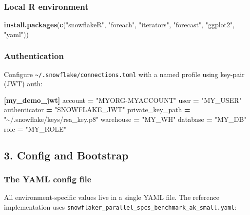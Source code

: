 \documentclass[
]{article}
\newenvironment{Shaded}{\begin{snugshade}}{\end{snugshade}}
\newcommand{\DataTypeTok}[1]{\textcolor[rgb]{0.13,0.29,0.53}{#1}}
\newcommand{\FunctionTok}[1]{\textcolor[rgb]{0.13,0.29,0.53}{\textbf{#1}}}
\newcommand{\KeywordTok}[1]{\textcolor[rgb]{0.13,0.29,0.53}{\textbf{#1}}}
\newcommand{\NormalTok}[1]{#1}
\newcommand{\OperatorTok}[1]{\textcolor[rgb]{0.81,0.36,0.00}{\textbf{#1}}}
\newcommand{\StringTok}[1]{\textcolor[rgb]{0.31,0.60,0.02}{#1}}
\begin{document}
\subsubsection{Local R environment}\label{local-r-environment}

\begin{Shaded}
\begin{Highlighting}[]
\FunctionTok{install.packages}\NormalTok{(}\FunctionTok{c}\NormalTok{(}\StringTok{"snowflakeR"}\NormalTok{, }\StringTok{"foreach"}\NormalTok{, }\StringTok{"iterators"}\NormalTok{, }\StringTok{"forecast"}\NormalTok{,}
                    \StringTok{"ggplot2"}\NormalTok{, }\StringTok{"yaml"}\NormalTok{))}
\end{Highlighting}
\end{Shaded}

\subsubsection{Authentication}\label{authentication}

Configure \texttt{\textasciitilde{}/.snowflake/connections.toml} with a
named profile using key-pair (JWT) auth:

\begin{Shaded}
\begin{Highlighting}[]
\KeywordTok{[my\_demo\_jwt]}
\DataTypeTok{account}   \OperatorTok{=} \StringTok{"MYORG{-}MYACCOUNT"}
\DataTypeTok{user}      \OperatorTok{=} \StringTok{"MY\_USER"}
\DataTypeTok{authenticator} \OperatorTok{=} \StringTok{"SNOWFLAKE\_JWT"}
\DataTypeTok{private\_key\_path} \OperatorTok{=} \StringTok{"\textasciitilde{}/.snowflake/keys/rsa\_key.p8"}
\DataTypeTok{warehouse} \OperatorTok{=} \StringTok{"MY\_WH"}
\DataTypeTok{database}  \OperatorTok{=} \StringTok{"MY\_DB"}
\DataTypeTok{role}      \OperatorTok{=} \StringTok{"MY\_ROLE"}
\end{Highlighting}
\end{Shaded}

\subsection{3. Config and Bootstrap}\label{config-and-bootstrap}

\subsubsection{The YAML config file}\label{the-yaml-config-file}

All environment-specific values live in a single YAML file. The
reference implementation uses
\texttt{snowflaker\_parallel\_spcs\_benchmark\_ak\_small.yaml}:
\end{document}
